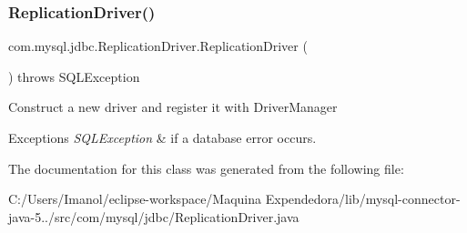 \subsubsection{\texorpdfstring{Replication\+Driver()}{ReplicationDriver()}}
{\footnotesize\ttfamily com.\+mysql.\+jdbc.\+Replication\+Driver.\+Replication\+Driver (\begin{DoxyParamCaption}{ }\end{DoxyParamCaption}) throws S\+Q\+L\+Exception}

Construct a new driver and register it with Driver\+Manager


\begin{DoxyExceptions}{Exceptions}
{\em S\+Q\+L\+Exception} & if a database error occurs. \\
\hline
\end{DoxyExceptions}


The documentation for this class was generated from the following file\+:\begin{DoxyCompactItemize}
\item 
C\+:/\+Users/\+Imanol/eclipse-\/workspace/\+Maquina Expendedora/lib/mysql-\/connector-\/java-\/5../src/com/mysql/jdbc/Replication\+Driver.\+java\end{DoxyCompactItemize}
